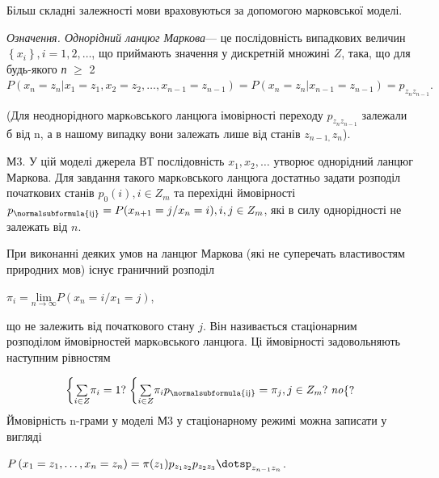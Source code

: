 Більш складні залежності мови враховуються за допомогою марковської моделі.

\textit{Означення}\textit{. Однорідний ланцюг Маркова}--- це послідовність
випадкових величин  
${\left\{x_{{i}}\right.\left.\right\},i=1,2,\dots}$, що 
приймають значення у дискретній множині  ${Z}$, така, що для будь-якого 
\textit{п }${\geq}$ 2 
${P\left(x_{{n}}=z_{{n}}|x_{{1}}=z_{{1}},x_{{2}}=z_{{2}},\dots,x_{{n-1}}=z_{{n-1}}\right)=P\left(x_{{n}}=z_{{n}}|x_{{n-1}}=z_{{n-1}}\right)=p_{{z_{{n}}z_{{n-1}}}}\text{.}}$

 (Для неоднорідного маркoвського ланцюга імовірності переходу 
${p_{{z_{{n}}z_{{n-1}}}}}$ залежали б від n, а в нашому випадку вони залежать
лише від станів  ${z_{{n-1,}}z_{{n}}}$).

М3. У цій моделі джерела ВТ послідовність 
${x_{{1}},x_{{2}},\dots}$  утворює однорідний ланцюг
Маркова. Для завдання такого маркoвського ланцюга достатньо задати розподіл
початкових станів  ${p_{{0}}(i),i\in Z_{{m}}}$ та перехідні ймовірності 
${p_{{\normalsubformula{\text{ij}}}}=P(x_{{n+1}}=j/x_{{n}}=i),i,j\in Z_{{m}}}$,
які в силу однорідності не залежать від  ${n}$.

 При виконанні деяких умов на ланцюг Маркова (які не суперечать  властивостям
природних мов) існує граничний розподіл

{\centering
 ${\pi _{{i}}=\underset{{n\rightarrow \infty
}}{{\text{lim}}}P\left(x_{{n}}=i/x_{{1}}=j\right)}$,
\par}

що не залежить від початкового стану  ${j}$. Він називається стаціонарним
розподілом ймовірностей маркoвського ланцюга. Ці ймовірності задовольняють
наступним рівностям

\begin{equation*}
{\begin{matrix}\left\{\underset{{i\in Z}}{\sum }{\pi
_{{i}}}=1?\right.\left\{\underset{{i\in Z}}{\sum }{\pi
_{{i}}p_{{\normalsubformula{\text{ij}}}}}=\pi _{{j}},j\in
Z_{{m}}?\right.\mathit{no}\hfill\null \end{matrix}\{?}
\end{equation*}
Ймовірність n-грами у моделі М3 у стаціонарному режимі можна записати у вигляді


\bigskip

{\centering
 ${P\left(x_{{1}}=z_{{1}},\dots,x_{{n}}=z_{{n}}\right)=\pi
(z_{{1}})p_{{z_{{1}}z_{{2}}}}p_{z_{{2}}z_{{3}}}{\dotsp_{z_{{n-1}}z_{{n}}}}}$.
\par}



